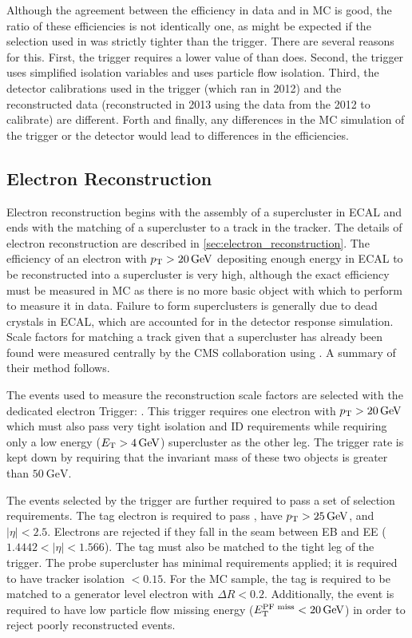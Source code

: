 Although the agreement between the efficiency in data and in MC is good, the
ratio of these efficiencies is not identically one, as might be expected if the
selection used in \TnP was strictly tighter than the trigger. There are several
reasons for this. First, the trigger requires a lower value of \HOverE than
\EGTIGHT does. Second, the trigger uses simplified isolation variables and
\EGTIGHT uses particle flow isolation. Third, the detector calibrations used in
the trigger (which ran in 2012) and the reconstructed data (reconstructed in
2013 using the data from the 2012 to calibrate) are different. Forth and
finally, any differences in the MC simulation of the trigger or the detector
would lead to differences in the efficiencies.

\subsection{Electron Reconstruction}
\label{ssec:sf_reconstruction}

Electron reconstruction begins with the assembly of a supercluster in ECAL and
ends with the matching of a supercluster to a track in the tracker. The details
of electron reconstruction are described in \cref{sec:electron_reconstruction}.
The efficiency of an electron with $\pt > \SI{20}{\GeV}$ depositing enough
energy in ECAL to be reconstructed into a supercluster is very high, although
the exact efficiency must be measured in MC as there is no more basic object
with which to perform \TnP to measure it in data. Failure to form superclusters
is generally due to dead crystals in ECAL, which are accounted for in the
detector response simulation. Scale factors for matching a track given that a
supercluster has already been found were measured centrally by the CMS
collaboration using \TnP \cite{gsf_scale_factors_2013}. A summary of their
method follows.

The events used to measure the reconstruction scale factors are selected with
the dedicated electron \TnP Trigger: \TnPTrigger. This trigger requires one
electron with $\pt > \SI{20}{\GeV}$ which must also pass very tight isolation
and ID requirements while requiring only a low energy ($\et > \SI{4}{\GeV}$)
supercluster as the other leg. The trigger rate is kept down by requiring that
the invariant mass of these two objects is greater than $\SI{50}{\GeV}$.

The events selected by the trigger are further required to pass a set of
selection requirements. The tag electron is required to pass \EGTIGHT, have
$\pt > \SI{25}{\GeV}$, and $|\eta| < 2.5$. Electrons are rejected if they fall
in the seam between EB and EE ($1.4442 < |\eta| < 1.566$). The tag must also be
matched to the tight leg of the \TnP trigger. The probe supercluster has
minimal requirements applied; it is required to have tracker isolation $<
0.15$. For the MC sample, the tag is required to be matched to a generator
level electron with $\Delta R < 0.2$. Additionally, the event is required to
have low particle flow missing energy ($\PFMET < \SI{20}{\GeV}$) in order to
reject poorly reconstructed events.

